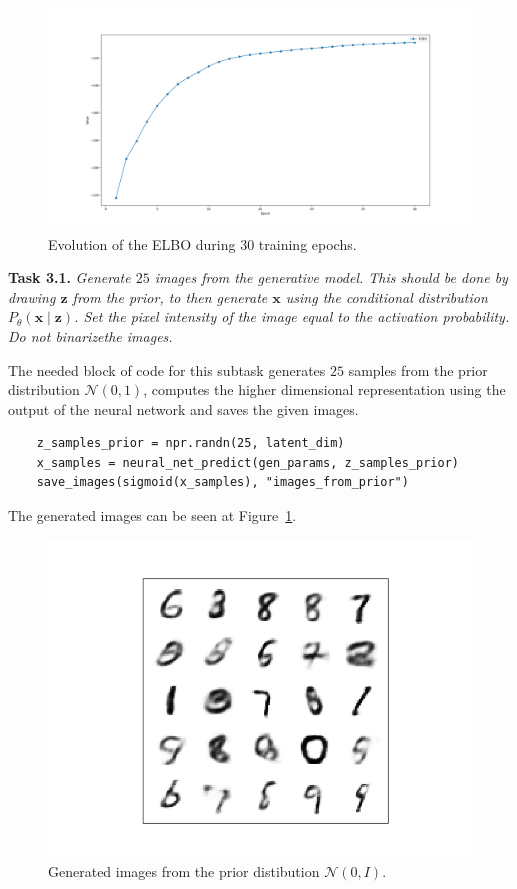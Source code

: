 \documentclass[11pt]{article}
\begin{document}
\begin{figure}[H]
  \centering
  \includegraphics[scale = 0.3]{imgs/elbo.png}
  \caption{Evolution of the ELBO during 30 training epochs.}
  \end{figure}

\textbf{Task 3.1.} \emph{Generate \( 25 \) images from the generative model. This should be done by drawing \( \bm{z} \) from the prior, to then generate \( \bm{x} \) using the conditional distribution \( P_{\theta}(\bm{x} \mid \bm{z}) \). Set the pixel intensity of the image equal to the activation probability. Do not binarizethe images.}

The needed block of code for this subtask generates \( 25 \) samples from the prior distribution \( \mathcal{N}(0, 1) \), computes the higher dimensional representation using the output of the neural network and saves the given images.

\begin{verbatim}
    z_samples_prior = npr.randn(25, latent_dim)
    x_samples = neural_net_predict(gen_params, z_samples_prior)
    save_images(sigmoid(x_samples), "images_from_prior")
\end{verbatim}

The generated images can be seen at Figure~\ref{img:3.1}.
\begin{figure}[H]
  \centering
  \includegraphics[scale = 0.5]{imgs/images_from_prior.png}
  \caption{Generated images from the prior distibution \( \mathcal{N}(0, I) \). }\label{img:3.1}
\end{figure}
\end{document}
